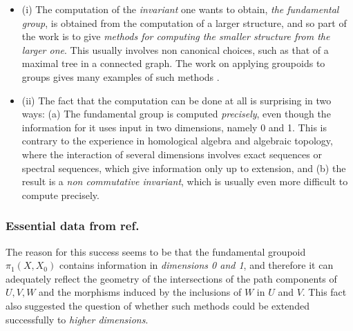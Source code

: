 \documentclass[12pt]{article}
\theoremstyle{plain}
\theoremstyle{definition}
\numberwithin{equation}{section}
\begin{document}
\begin{itemize}
\item (i) The computation of the \emph{invariant} one wants to obtain, 
\emph{the fundamental group}, is obtained from the computation of a larger structure, and so part of the 
work is to give \emph{methods for computing the smaller structure from the larger one}. This 
usually involves non canonical choices, such as that of a maximal tree in a connected graph. 
The work on applying groupoids to groups gives many examples of such methods 
\cite{HPJ2k5, BR-HPJ-SR2k5}.

\item (ii) The fact that the computation can be done at all is surprising in two ways: 
(a) The fundamental group is computed {\it precisely}, even though the information for it uses input in two
dimensions, namely 0 and 1. This is contrary to the experience in homological algebra and algebraic topology, where the interaction of several dimensions involves exact sequences or spectral sequences, which give information only up to extension,  and (b) the result is a \emph{non commutative invariant}, which is usually even more difficult to 
compute precisely.
\end{itemize}

\subsubsection{Essential data from ref. \cite{BHKP}}
The reason for this success seems to be that the fundamental groupoid $\pi_1(X,X_0)$ contains 
information in \emph{dimensions 0 and 1}, and therefore it can adequately reflect the geometry 
of the intersections of the path components of $U,V,W$ and the morphisms induced by the 
inclusions of $W$ in $U$ and $V$. This fact also suggested the question of whether such 
methods could be extended successfully to \emph{higher dimensions}.
\end{document}
